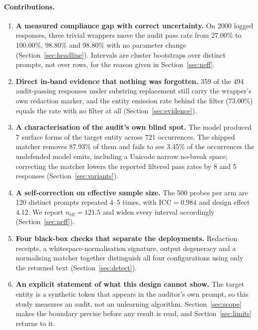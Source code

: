\documentclass[journal]{IEEEtran}
\theoremstyle{definition}
\newcommand{\Nrows}{2000}
\newcommand{\Nper}{500}
\newcommand{\Ndistinct}{120}
\newcommand{\RepLo}{4}
\newcommand{\RepHi}{5}
\newcommand{\NoneRate}{27.00}
\newcommand{\PfRate}{100.00}
\newcommand{\OfK}{494}
\newcommand{\OfRate}{98.80}
\newcommand{\SenRate}{98.80}
\newcommand{\FpOf}{8}
\newcommand{\FpSen}{5}
\newcommand{\VarTotal}{721}
\newcommand{\VarBlindNonePc}{3.45}
\newcommand{\VarScrubPc}{87.93}
\newcommand{\Nvariants}{7}
\newcommand{\IccNone}{0.984}
\newcommand{\DeffNone}{4.12}
\newcommand{\NeffNone}{121.5}
\newcommand{\EmitRate}{73.00}
\newcommand{\RedactPassing}{359}
\begin{document}
\paragraph{Contributions.}
\begin{enumerate}
\item \textbf{A measured compliance gap with correct uncertainty.} On \Nrows{}
logged responses, three trivial wrappers move the audit pass rate from
\NoneRate\% to \PfRate\%, \OfRate\% and \SenRate\% with no parameter change
(Section~\ref{sec:headline}). Intervals are cluster bootstraps over distinct
prompts, not over rows, for the reason given in Section~\ref{sec:neff}.

\item \textbf{Direct in-band evidence that nothing was forgotten.}
\RedactPassing{} of the \OfK{} audit-passing responses under substring
replacement still carry the wrapper's own redaction marker, and the entity
emission rate behind the filter (\EmitRate\%) equals the rate with no filter at
all (Section~\ref{sec:evidence}).

\item \textbf{A characterisation of the audit's own blind spot.} The model
produced \Nvariants{} surface forms of the target entity across \VarTotal{}
occurrences. The shipped matcher removes \VarScrubPc\% of them and fails to see
\VarBlindNonePc\% of the occurrences the undefended model emits, including a
Unicode narrow no-break space; correcting the matcher lowers the reported
filtered pass rates by \FpOf{} and \FpSen{} responses
(Section~\ref{sec:variants}).

\item \textbf{A self-correction on effective sample size.} The \Nper{} probes per
arm are \Ndistinct{} distinct prompts repeated \RepLo{}--\RepHi{} times, with
$\mathrm{ICC}=\IccNone{}$ and design effect \DeffNone{}. We report
$n_{\mathrm{eff}} = \NeffNone{}$ and widen every interval accordingly
(Section~\ref{sec:neff}).

\item \textbf{Four black-box checks that separate the deployments.} Redaction
receipts, a whitespace-normalisation signature, output degeneracy and a
normalising matcher together distinguish all four configurations using only the
returned text (Section~\ref{sec:detect}).

\item \textbf{An explicit statement of what this design cannot show.} The target
entity is a synthetic token that appears in the auditor's own prompt, so this
study measures an audit, not an unlearning algorithm. Section~\ref{sec:scope}
makes the boundary precise before any result is read, and
Section~\ref{sec:limits} returns to it.
\end{enumerate}
\end{document}
